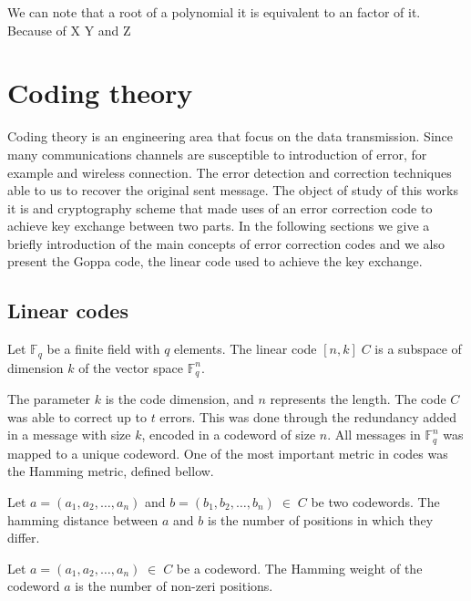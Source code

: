 We can note that a root of a polynomial it is equivalent to an factor of it. Because of X Y and Z

\section{Coding theory}
Coding theory is an engineering area that focus on the data transmission. Since many communications channels are susceptible to introduction of error, for example and wireless connection. The error detection and correction techniques able to us to recover the original sent message. The object of study of this works it is and cryptography scheme that made uses of an error correction code to achieve key exchange between two parts. In the following sections we give a briefly introduction of the main concepts of error correction codes and we also present the Goppa code, the linear code used to achieve the key exchange.


\subsection{Linear codes}
\begin{definition}
Let $\mathbb{F}_{q}$ be a finite field with $q$ elements. The linear code $[n, k]\;C$ is a subspace of dimension $k$ of the vector space $\mathbb{F}_{q}^n$.
\end{definition}

The parameter $k$ is the code dimension, and $n$ represents the length. The code $C$ was able to correct up to $t$ errors. This was done through the redundancy added in a message with size $k$, encoded in a codeword of size $n$. All messages in $\mathbb{F}_{q}^n$ was mapped to a unique codeword. One of the most important metric in codes was the Hamming metric, defined bellow.

\begin{definition}
Let $a = (a_1, a_2, \dots, a_n)$ and $b = (b_1, b_2, \dots, b_n) \; \in \; C$ be two codewords. The hamming distance between $a$ and $b$ is the number of positions in which they differ.
\end{definition}

\begin{definition}
Let $a = (a_1, a_2, \dots, a_n) \; \in \; C$ be a codeword. The Hamming weight of the codeword $a$ is the number of non-zeri positions.
\end{definition}



